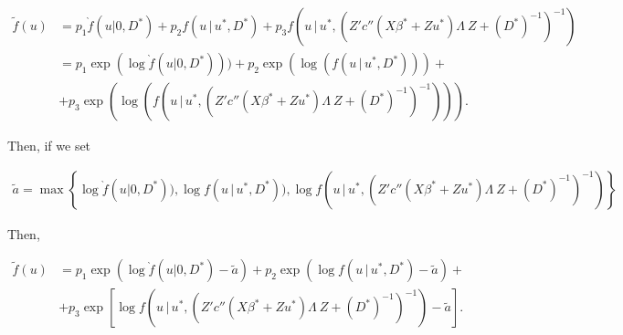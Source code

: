 \documentclass{article}
\begin{document}
\begin{align}
\tilde{f}(u) &= p_1  \grave{f}(u|0,D^*)+p_2  f(u \, | \, u^*, D^*)+p_3  f(u \, | \, u^*, (Z'  c''(X \beta^*+Zu^*) \Lambda \ Z +(D^*)^{-1}   )^{-1}) \\
&= p_1 \exp( \log  \grave{f}(u|0,D^*) ))+p_2 \exp( \log(  f(u \, | \, u^*, D^*) ))+ \nonumber \\
&+ p_3 \exp( \log( f(u \, | \, u^*, (Z'  c''(X \beta^*+Zu^*) \Lambda \ Z +(D^*)^{-1}   )^{-1}) )).
\end{align}

\noindent Then, if we set

\begin{align}
\tilde{a}= \max \left\{ \log  \grave{f}(u|0,D^*) ), \log  f(u \, | \, u^*, D^*) ), \log f(u \, | \, u^*, (Z'  c''(X \beta^*+Zu^*) \Lambda \ Z +(D^*)^{-1}   )^{-1})  \right\}
\end{align}

Then, 

\begin{align}
 \tilde{f}(u) 
&= p_1 \exp\left( \log  \grave{f}(u|0,D^*)  -\tilde{a}\right)+p_2 \exp \left( \log  f(u \, | \, u^*, D^* )-\tilde{a} \right)+ \nonumber\\
&+ p_3 \exp\left[ \log f \left(u \, | \, u^*, (Z'  c''(X \beta^*+Zu^*) \Lambda \ Z +(D^*)^{-1}   )^{-1} \right)  -\tilde{a} \right].
\end{align}
\end{document}

